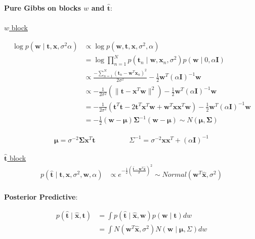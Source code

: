 \documentclass[10pt]{homeworg}
\begin{document}
\newpage

\textbf{Pure Gibbs on blocks $w$ and $\hat{\boldsymbol t}$}:\\
\\
\underline{$w$ block}

\begin{align*}
\log{p(\boldsymbol w \mid \boldsymbol t,\boldsymbol x,\sigma^2\alpha)} &\propto \log{p(\boldsymbol w,\boldsymbol t,\boldsymbol x,\sigma^2,\alpha)}\\
&= \log{\prod_{n=1}^N p(\boldsymbol t_n \mid \boldsymbol w,\boldsymbol x_n,\sigma^2)p(\boldsymbol w \mid 0, \alpha \boldsymbol I)}\\
&\propto \frac{-\sum_{n=1}^N (\boldsymbol t_n-\boldsymbol w^T\boldsymbol x_n)^2}{2\sigma^2} - \frac{1}{2}\boldsymbol w^T(\alpha \boldsymbol I)^{-1}\boldsymbol w\\
&\propto -\frac{1}{2\sigma^2}(\|\boldsymbol t-\boldsymbol x^T\boldsymbol w \|^2)-\frac{1}{2}\boldsymbol w^T(\alpha \boldsymbol I)^{-1}\boldsymbol w\\
&= -\frac{1}{2\sigma^2}(\boldsymbol t^T\boldsymbol t-2\boldsymbol t^T\boldsymbol x^T\boldsymbol w+\boldsymbol w^T\boldsymbol x\boldsymbol x^T\boldsymbol w)-\frac{1}{2}\boldsymbol w^T(\alpha \boldsymbol I)^{-1}\boldsymbol w\\
&= -\frac{1}{2}(\boldsymbol w-\boldsymbol \mu)\boldsymbol \Sigma^{-1}(\boldsymbol w-\boldsymbol \mu) \sim N(\boldsymbol \mu,\boldsymbol \Sigma)
\end{align*}

\vspace{-1cm}

\begin{align*}
\boldsymbol \mu = \sigma^{-2}\boldsymbol \Sigma \boldsymbol x^T \boldsymbol t  \hspace{2cm} \Sigma^{-1} = \sigma^{-2}\boldsymbol x\boldsymbol x^T + (\alpha \boldsymbol I)^{-1}
\end{align*}


\underline{$\hat{\boldsymbol t}$ block}
\begin{align*}
p(\hat{\boldsymbol t} \mid \boldsymbol t, \boldsymbol x, \sigma^2, \boldsymbol w, \alpha) &\propto e^{-\frac{1}{2}(\frac{\hat{\boldsymbol t}-\boldsymbol w^T\hat{\boldsymbol x}}{\sigma})^2} \sim Normal(\boldsymbol w^T\hat{\boldsymbol x}, \sigma^2)
\end{align*}
\\


\textbf{Posterior Predictive}:

\begin{align*}
p(\hat{\boldsymbol t} \mid \hat{\boldsymbol x}, \boldsymbol t) &= \int p(\hat{\boldsymbol t} \mid \hat{\boldsymbol x}, \boldsymbol w)p(\boldsymbol w \mid \boldsymbol t)dw\\
&= \int N(\boldsymbol w^T \hat{\boldsymbol x}, \sigma^2)N(\boldsymbol w \mid \boldsymbol \mu, \Sigma)dw
\end{align*}
\end{document}

